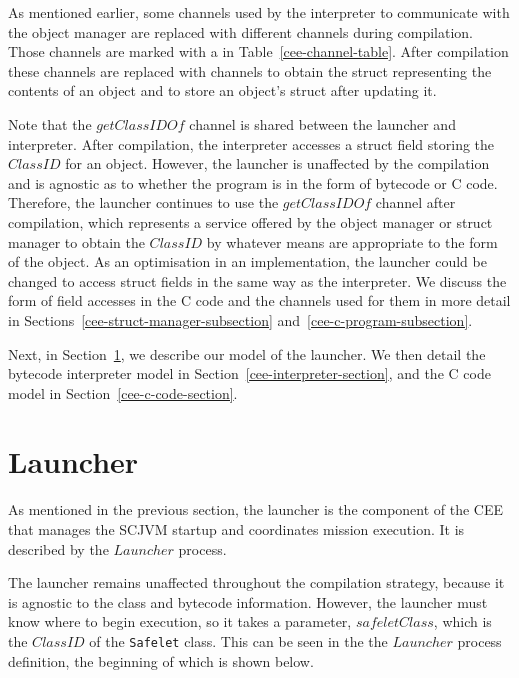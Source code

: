 As mentioned earlier, some channels used by the interpreter to
communicate with the object manager are replaced with different
channels during compilation.
Those channels are marked with a \ddag{} in
Table~\ref{cee-channel-table}.
After compilation these channels are replaced with channels to obtain
the struct representing the contents of an object and to store an
object’s struct after updating it.

Note that the $getClassIDOf$ channel is shared between the launcher
and interpreter.
After compilation, the interpreter accesses a struct field storing the
$ClassID$ for an object.
However, the launcher is unaffected by the compilation and is agnostic
as to whether the program is in the form of bytecode or C code.
Therefore, the launcher continues to use the $getClassIDOf$ channel
after compilation, which represents a service offered by the object
manager or struct manager to obtain the $ClassID$ by whatever means
are appropriate to the form of the object.
As an optimisation in an implementation, the launcher could be changed
to access struct fields in the same way as the interpreter.
We discuss the form of field accesses in the C code and the channels
used for them in more detail in
Sections~\ref{cee-struct-manager-subsection}
and~\ref{cee-c-program-subsection}.

%

%


Next, in Section~\ref{cee-launcher-section}, we describe our model of
the launcher.
We then detail the bytecode interpreter model in
Section~\ref{cee-interpreter-section}, and the C code model in
Section~\ref{cee-c-code-section}.

\section{Launcher}
\label{cee-launcher-section}

As mentioned in the previous section, the launcher is the component of
the CEE that manages the SCJVM startup and coordinates mission
execution.
It is described by the $Launcher$ process.

The launcher remains unaffected throughout the compilation strategy,
because it is agnostic to the class and bytecode information.
However, the launcher must know where to begin execution, so it takes
a parameter, $safeletClass$, which is the $ClassID$ of the
\texttt{Safelet} class.
This can be seen in the the $Launcher$ process definition, the
beginning of which is shown below.

